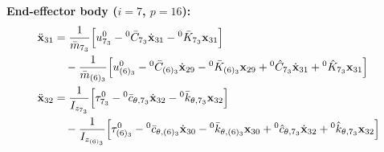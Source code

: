 \textbf{End-effector body ($i=7$, $p=16$):}
\begin{align}
    \ddot{\mathbf{x}}_{31} &=
    \frac{1}{\bar{m}_{7_3}} \Big[ u^0_{7_3} - {}^0\bar{C}_{7_3}\dot{\mathbf{x}}_{31} - {}^0\bar{K}_{7_3}\mathbf{x}_{31} \Big] \notag \\
    &\quad - \frac{1}{\bar{m}_{(6)_3}} \Big[ u^0_{(6)_3} - {}^0\bar{C}_{(6)_3}\dot{\mathbf{x}}_{29} - {}^0\bar{K}_{(6)_3}\mathbf{x}_{29} + {}^0\hat{C}_{7_3}\dot{\mathbf{x}}_{31} + {}^0\hat{K}_{7_3}\mathbf{x}_{31} \Big] \\
    \ddot{\mathbf{x}}_{32} &=
    \frac{1}{I_{z_{7_3}}} \Big[ \tau^0_{7_3} - {}^0\bar{c}_{\theta,7_3}\dot{\mathbf{x}}_{32} - {}^0\bar{k}_{\theta,7_3}\mathbf{x}_{32} \Big] \notag \\
    &\quad - \frac{1}{I_{z_{(6)_3}}} \Big[ \tau^0_{(6)_3} - {}^0\bar{c}_{\theta,(6)_3}\dot{\mathbf{x}}_{30} - {}^0\bar{k}_{\theta,(6)_3}\mathbf{x}_{30} + {}^0\hat{c}_{\theta,7_3}\dot{\mathbf{x}}_{32} + {}^0\hat{k}_{\theta,7_3}\mathbf{x}_{32} \Big]
\end{align}


